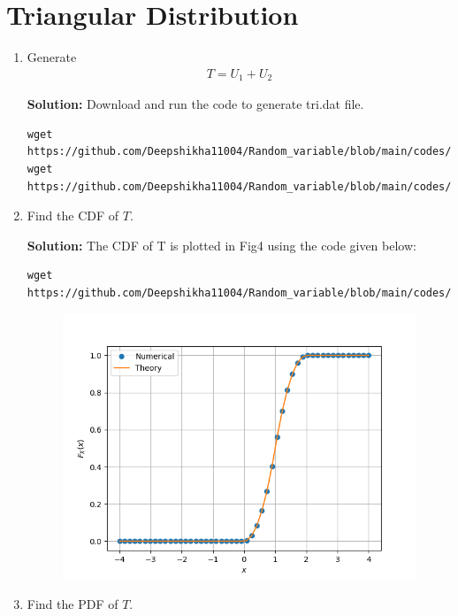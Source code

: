 \documentclass[journal,12pt,twocolumn]{IEEEtran}
\renewcommand\thesection{\arabic{section}}
\begin{document}
\section{Triangular Distribution}
\begin{enumerate}[label=\thesection.\arabic*
,ref=\thesection.\theenumi]
%
\item Generate 
	\begin{align}
		T = U_1+U_2
	\end{align}

\textbf{Solution:}	
Download  and run the code to generate tri.dat file.
\begin{lstlisting}
wget https://github.com/Deepshikha11004/Random_variable/blob/main/codes/main.c
wget https://github.com/Deepshikha11004/Random_variable/blob/main/codes/coeffs.h
\end{lstlisting}

	
\item Find the CDF of $T$.


\textbf{Solution:}
The CDF of T is plotted in Fig4 using the code given below:
\begin{lstlisting}
wget https://github.com/Deepshikha11004/Random_variable/blob/main/codes/t_cdf_plot2.py
\end{lstlisting}
\begin{figure}[!ht]
    \centering
    \includegraphics[width=\columnwidth]
    {t_cdf2.png}
    \caption{}
    \label{fig3}
\end{figure}





\item Find the PDF of $T$.



\end{enumerate}
\end{document}
